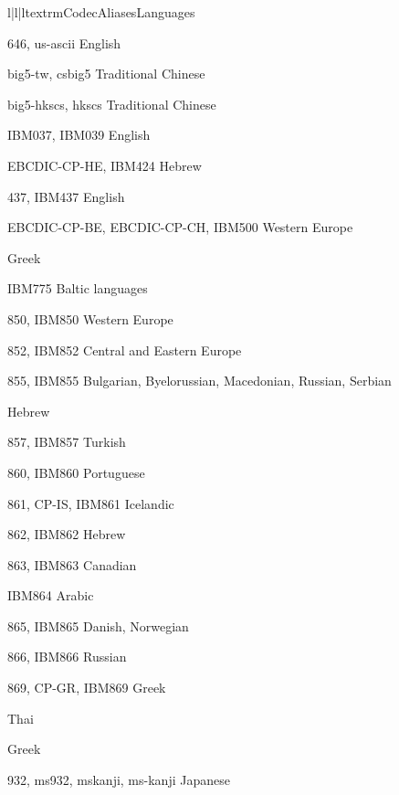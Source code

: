 \begin{longtableiii}{l|l|l}{textrm}{Codec}{Aliases}{Languages}

        {646, us-ascii}
        {English}

        {big5-tw, csbig5}
        {Traditional Chinese}

        {big5-hkscs, hkscs}
        {Traditional Chinese}

        {IBM037, IBM039}
        {English}

        {EBCDIC-CP-HE, IBM424}
        {Hebrew}

        {437, IBM437}
        {English}

        {EBCDIC-CP-BE, EBCDIC-CP-CH, IBM500}
        {Western Europe}

        {}
        {Greek}

        {IBM775}
        {Baltic languages}

        {850, IBM850}
        {Western Europe}

        {852, IBM852}
        {Central and Eastern Europe}

        {855, IBM855}
        {Bulgarian, Byelorussian, Macedonian, Russian, Serbian}

        {}
        {Hebrew}

        {857, IBM857}
        {Turkish}

        {860, IBM860}
        {Portuguese}

        {861, CP-IS, IBM861}
        {Icelandic}

        {862, IBM862}
        {Hebrew}

        {863, IBM863}
        {Canadian}

        {IBM864}
        {Arabic}

        {865, IBM865}
        {Danish, Norwegian}

        {866, IBM866}
        {Russian}

        {869, CP-GR, IBM869}
        {Greek}

        {}
        {Thai}

        {}
        {Greek}

        {932, ms932, mskanji, ms-kanji}
        {Japanese}


\end{longtableiii}
